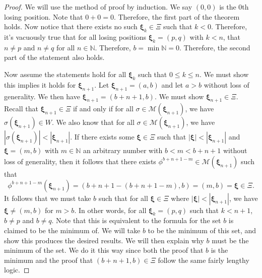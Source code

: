 \documentclass[11pt, letterpaper]{article}
\begin{document}
\begin{proof}
	We will use the method of proof by induction. We say $(0,0)$ is the $0$th losing position. Note that $0+0=0$. Therefore, the first part of the theorem holds. Now notice that there exists no such $\boldsymbol{\xi}_k\in \Xi $ such that $k<0$. Therefore, it's vacuously true that for all losing positions $\boldsymbol{\xi}_k=(p,q)$ with $k<n$, that $n\neq p$ and $n\neq q$ for all $n\in\mathbb{N}$. Therefore, $b=\min \mathbb{N}=0$. Therefore, the second part of the statement also holds.

Now assume the statements hold for all $\boldsymbol{\xi }_k$ such that $0\leq k\leq n$. We must show this implies it holds for $\boldsymbol{\xi} _{n+1}$. Let $\boldsymbol{\xi} _{n+1}=(a,b)$ and let $a>b$ without loss of generality. We then have $\boldsymbol{\xi} _{n+1}=(b+n+1,b)$. We must show $\boldsymbol{\xi} _{n+1}\in \Xi $. Recall that $\boldsymbol{\xi} _{n+1}\in \Xi $ if and only if for all $\sigma \in \mathscr{M} \left( \boldsymbol{\xi} _{n+1} \right) $, we have $\sigma (\boldsymbol{\xi} _{n+1})\in W $. We also know that for all $\sigma \in \mathscr{M} \left( \boldsymbol{\xi} _{n+1} \right) $, we have $\left| \sigma \left( \boldsymbol{\xi} _{n+1} \right)  \right| <\left| \boldsymbol{\xi} _{n+1} \right| $. If there exists some $\boldsymbol{\xi} \in \Xi $ such that $\left| \boldsymbol{\xi}  \right| <\left| \boldsymbol{\xi} _{n+1} \right| $ and $\boldsymbol{\xi} =(m,b)$ with $m \in\mathbb{N}$ an arbitrary number with $b<m<b+n+1$ without loss of generality, then it follows that there exists $\phi ^{b+n+1-m}\in \mathscr{M} \left( \boldsymbol{\xi} _{n+1} \right) $ such that 
\[\phi ^{b+n+1-m}(\boldsymbol{\xi} _{n+1})=(b+n+1-(b+n+1-m),b)=(m,b)= \boldsymbol{\xi} \in\Xi .\]
It follows that we must take $b$ such that for all $\boldsymbol{\xi}\in \Xi $ where $\left| \boldsymbol{\xi}  \right| <\left| \boldsymbol{\xi} _{n+1} \right| $, we have $\boldsymbol{\xi} \neq (m,b)$ for $m>b$. In other words, for all $\boldsymbol{\xi} _k=(p,q)$ such that $k<n+1$, $b\neq p$ and $b\neq q$. Note that this is equivalent to the formula for the set $b$ is claimed to be the minimum of. We will take $b$ to be the minimum of this set, and show this produces the desired results. We will then explain why $b$ must be the minimum of the set. We do it this way since both the proof that $b$ is the minimum and the proof that $(b+n+1,b)\in \Xi $ follow the same fairly lengthy logic.


\end{proof}
\end{document}
